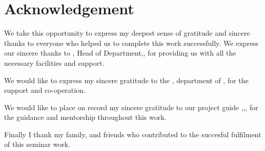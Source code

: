 \chapter*{Acknowledgement}%
%



\par We take this opportunity to express my deepest sense of gratitude and sincere thanks to everyone who helped us to complete this work successfully. We express our sincere thanks to \hod, Head of Department,\dept, \college\hspace*{2pt} \collegeplace \hspace*{2pt}for providing us with all the necessary facilities and support.\par

We would like to express my sincere gratitude to the \projcordinatorA, \hspace*{2pt} department of\hspace*{2pt} \dept, \hspace*{2pt} \college \hspace*{2pt} \collegeplace \hspace*{2pt} for the support and co-operation.

We would like to place on record my sincere gratitude to our project guide \guide,\hspace*{2pt}\guidedes,\hspace*{2pt}\dept,\hspace*{2pt}\college \hspace*{2pt} %
for the guidance and mentorship throughout this work.

Finally I thank my family, and friends who contributed to the succesful fulfilment of this seminar work.

\vspace*{30pt}
\begin{flushright}
	\textbf{\studentA}\\
	\textbf{\studentB}\\
	\textbf{\studentC}\\
	\textbf{\studentD}\\
\end{flushright}
\thispagestyle{plain}
